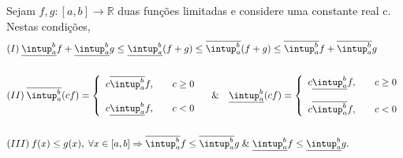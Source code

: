 \documentclass[../analysisII_notes.tex]{subfiles}
\begin{document}
\hypertarget{integral_operator}{
	\begin{theorem*}
		Sejam \(f, g:[a, b]\rightarrow \mathbb{R}\) duas funções limitadas e considere uma constante real c. Nestas condições,
		\begin{align*}
			 & (I)\: \underline{\intup_{a}^{b}}f + \underline{\intup_{a}^{b}}g \leq \underline{\intup_{a}^{b}}(f+g)\leq \overline{\intup_{a}^{b}}(f+g)\leq \overline{\intup_{a}^{b}}f + \overline{\intup_{a}^{b}}g \\
			\\
			 & (II)\: \overline{\intup_{a}^{b}}(cf) = \left\{\begin{array}{ll}
				                                                 c \overline{\intup_{a}^{b}}f,  & \quad c\geq 0 \\
				                                                 \\
				                                                 c \underline{\intup_{a}^{b}}f, & \quad c<0
			                                                 \end{array}\right. \quad\&\quad \underline{\intup_{a}^{b}}(cf) = \left\{\begin{array}{ll}
				                                                                                                                         c \underline{\intup_{a}^{b}}f, & \quad c\geq 0 \\
				                                                                                                                         \\
				                                                                                                                         c \overline{\intup_{a}^{b}}f,  & \quad c<0
			                                                                                                                         \end{array}\right.                        \\
			\\
			 & (III)\: f(x)\leq g(x),\; \forall x\in[a, b] \Rightarrow \overline{\intup_{a}^{b}}f \leq \overline{\intup_{a}^{b}}g \;\&\; \underline{\intup_{a}^{b}}f \leq \underline{\intup_{a}^{b}}g.
		\end{align*}
	\end{theorem*}}
\end{document}
